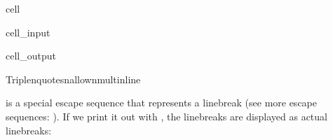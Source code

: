 \documentclass[letterpaper,10pt,english]{jupyterBook}
\begin{document}
\begin{sphinxuseclass}{cell}\begin{sphinxVerbatimInput}

\begin{sphinxuseclass}{cell_input}
\begin{sphinxVerbatim}[commandchars=\\\{\}]
\end{sphinxVerbatim}

\end{sphinxuseclass}\end{sphinxVerbatimInput}
\begin{sphinxVerbatimOutput}

\begin{sphinxuseclass}{cell_output}
\begin{sphinxVerbatim}[commandchars=\\\{\}]
\PYGZsq{}Triple\PYGZbs{}nquotes\PYGZbs{}nallow\PYGZbs{}nmulti\PYGZbs{}nline\PYGZsq{}
\end{sphinxVerbatim}

\end{sphinxuseclass}\end{sphinxVerbatimOutput}

\end{sphinxuseclass}
\sphinxAtStartPar
{} is a special escape sequence that represents a linebreak (see more escape sequences: ).
If we print it out with , the linebreaks are displayed as actual linebreaks:
\end{document}
